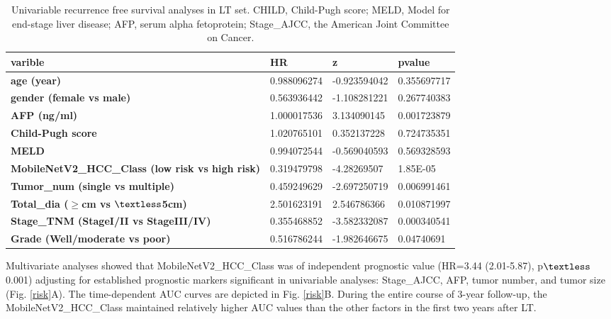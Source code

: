 \documentclass{article}
\begin{document}
\begin{table}[h]
	\centering
	\begin{tabular}{|l|l|l|l|}
		\hline
		\textbf{varible}                                         & \textbf{HR} & \textbf{z}   & \textbf{pvalue} \\ \hline
		\textbf{age (year)}                                      & 0.988096274 & -0.923594042 & 0.355697717     \\ \hline
		\textbf{gender (female vs male)}                         & 0.563936442 & -1.108281221 & 0.267740383     \\ \hline
		\textbf{AFP (ng/ml)}                                     & 1.000017536 & 3.134090145  & 0.001723879     \\ \hline
		\textbf{Child-Pugh score}                                & 1.020765101 & 0.352137228  & 0.724735351     \\ \hline
		\textbf{MELD}                                            & 0.994072544 & -0.569040593 & 0.569328593     \\ \hline
		\textbf{MobileNetV2\_HCC\_Class (low risk vs high risk)} & 0.319479798 & -4.28269507  & 1.85E-05        \\ \hline
		\textbf{Tumor\_num (single vs multiple)}                 & 0.459249629 & -2.697250719 & 0.006991461     \\ \hline
		\textbf{Total\_dia ($\geq$cm vs $\textless$5cm)}            & 2.501623191 & 2.546786366  & 0.010871997     \\ \hline
		\textbf{Stage\_TNM (StageI/II vs StageIII/IV)}           & 0.355468852 & -3.582332087 & 0.000340541     \\ \hline
		\textbf{Grade (Well/moderate vs poor)}                   & 0.516786244 & -1.982646675 & 0.04740691      \\ \hline
	\end{tabular}
	\caption{Univariable recurrence free survival analyses in LT set. CHILD, Child-Pugh score; MELD, Model for end-stage liver disease; AFP, serum alpha fetoprotein; Stage\_AJCC, the American Joint Committee on Cancer.}
	\label{S1}
\end{table}

Multivariate analyses showed that MobileNetV2\_HCC\_Class was of independent prognostic value (HR=3.44 (2.01-5.87), p$\textless$0.001) adjusting for established prognostic markers significant in univariable analyses: Stage\_AJCC, AFP, tumor number, and tumor size (Fig. \ref{risk}A). The time-dependent AUC curves are depicted in Fig. \ref{risk}B. During the entire course of 3-year follow-up, the MobileNetV2\_HCC\_Class maintained relatively higher AUC values than the other factors in the first two years after LT.
\end{document}
